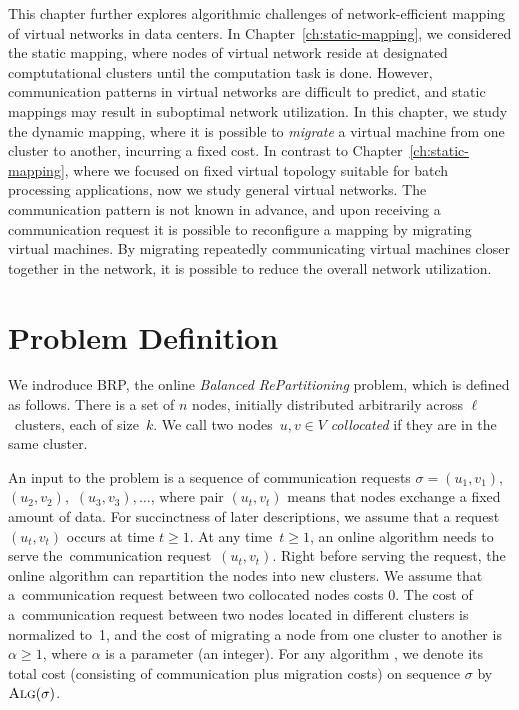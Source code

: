 This chapter further explores algorithmic challenges of network-efficient mapping of virtual networks in data centers.
In Chapter~\ref{ch:static-mapping}, we considered the static mapping, where nodes of virtual network reside at designated comptutational clusters until the computation task is done.
However, communication patterns in virtual networks are difficult to predict, and static mappings may result in suboptimal network utilization.
In this chapter, we study the dynamic mapping, where it is possible to \emph{migrate} a virtual machine from one cluster to another, incurring a fixed cost.
In contrast to Chapter~\ref{ch:static-mapping}, where we focused on fixed virtual topology suitable for batch processing applications, now we study general virtual networks.
The communication pattern is not known in advance, and upon receiving a communication request it is possible to reconfigure a mapping by migrating virtual machines.
By migrating repeatedly communicating virtual machines closer together in the network, it is possible to reduce the overall network utilization.

\section{Problem Definition}

We indroduce BRP, the online \emph{Balanced RePartitioning} problem, which is defined as
follows. There is a set of $n$ nodes, initially distributed arbitrarily
across $\ell$~clusters, each of size~$k$. We call two nodes~$u,v\in V$
\emph{collocated} if they are in the same cluster.

An input to the problem is a sequence of communication requests $\sigma =
(u_1,v_1),$ $(u_2,v_2),$ $(u_3,v_3), \ldots$, where pair $(u_t,v_t)$ means that
nodes exchange a fixed amount of data. For succinctness of later descriptions,
we assume that a request $(u_t,v_t)$ occurs at time $t \geq 1$. At any time~$t
\geq 1$, an online algorithm needs to serve the~communication
request~$(u_t,v_t)$. Right before serving the request, the online algorithm
can repartition the nodes into new clusters. We assume that
a~communication request between two collocated nodes costs 0. The cost of a~communication request between two nodes located in different clusters is
normalized to~1, and the cost of migrating a node from one cluster to another
is~$\alpha \geq 1$, where $\alpha$ is a parameter (an integer). For any
algorithm \ALG, we denote its total cost (consisting of communication plus
migration costs) on sequence $\sigma$ by $\textsc{Alg}(\sigma)$.

